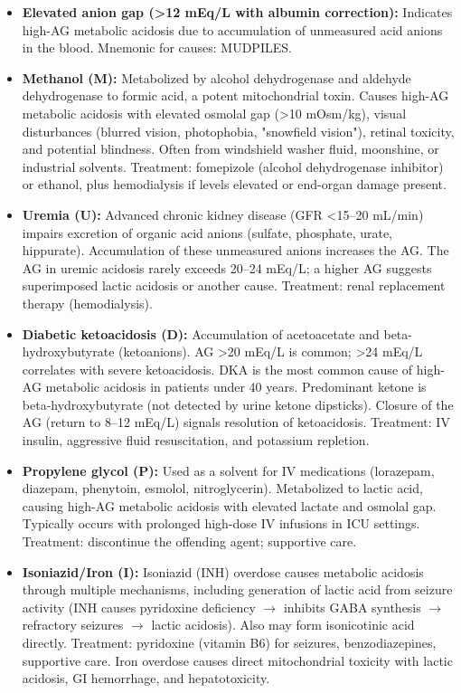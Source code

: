 \begin{itemize}
  \item \textbf{Elevated anion gap (>12 mEq/L with albumin correction):} Indicates high-AG metabolic acidosis due to accumulation of unmeasured acid anions in the blood. Mnemonic for causes: MUDPILES.
  \item \textbf{Methanol (M):} Metabolized by alcohol dehydrogenase and aldehyde dehydrogenase to formic acid, a potent mitochondrial toxin. Causes high-AG metabolic acidosis with elevated osmolal gap (>10 mOsm/kg), visual disturbances (blurred vision, photophobia, "snowfield vision"), retinal toxicity, and potential blindness. Often from windshield washer fluid, moonshine, or industrial solvents. Treatment: fomepizole (alcohol dehydrogenase inhibitor) or ethanol, plus hemodialysis if levels elevated or end-organ damage present.
  \item \textbf{Uremia (U):} Advanced chronic kidney disease (GFR <15--20 mL/min) impairs excretion of organic acid anions (sulfate, phosphate, urate, hippurate). Accumulation of these unmeasured anions increases the AG. The AG in uremic acidosis rarely exceeds 20--24 mEq/L; a higher AG suggests superimposed lactic acidosis or another cause. Treatment: renal replacement therapy (hemodialysis).
  \item \textbf{Diabetic ketoacidosis (D):} Accumulation of acetoacetate and beta-hydroxybutyrate (ketoanions). AG >20 mEq/L is common; >24 mEq/L correlates with severe ketoacidosis. DKA is the most common cause of high-AG metabolic acidosis in patients under 40 years. Predominant ketone is beta-hydroxybutyrate (not detected by urine ketone dipsticks). Closure of the AG (return to 8--12 mEq/L) signals resolution of ketoacidosis. Treatment: IV insulin, aggressive fluid resuscitation, and potassium repletion.
  \item \textbf{Propylene glycol (P):} Used as a solvent for IV medications (lorazepam, diazepam, phenytoin, esmolol, nitroglycerin). Metabolized to lactic acid, causing high-AG metabolic acidosis with elevated lactate and osmolal gap. Typically occurs with prolonged high-dose IV infusions in ICU settings. Treatment: discontinue the offending agent; supportive care.
  \item \textbf{Isoniazid/Iron (I):} Isoniazid (INH) overdose causes metabolic acidosis through multiple mechanisms, including generation of lactic acid from seizure activity (INH causes pyridoxine deficiency $\rightarrow$ inhibits GABA synthesis $\rightarrow$ refractory seizures $\rightarrow$ lactic acidosis). Also may form isonicotinic acid directly. Treatment: pyridoxine (vitamin B6) for seizures, benzodiazepines, supportive care. Iron overdose causes direct mitochondrial toxicity with lactic acidosis, GI hemorrhage, and hepatotoxicity.

\end{itemize}

